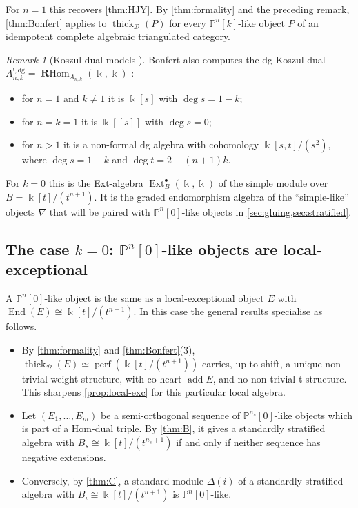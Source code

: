 \documentclass[11pt,reqno]{amsart}
\theoremstyle{plain}
\theoremstyle{definition}
\theoremstyle{remark}
\newtheorem{remark}[theorem]{Remark}
\newcommand{\kk}{\Bbbk}
\DeclareMathOperator{\End}{End}
\DeclareMathOperator{\Ext}{Ext}
\DeclareMathOperator{\add}{add}
\DeclareMathOperator{\RHom}{\mathbf{R}Hom}
\newcommand{\thick}[2][\cD]{\operatorname{thick}_{#1}(#2)}
\newcommand{\Pn}[2]{\mathbb{P}^{#1}[#2]}
\newcommand{\nablabar}{\overline{\nabla}}
\newcommand{\cD}{\mathcal{D}}
\begin{document}
For $n=1$ this recovers \cref{thm:HJY}. By \cref{thm:formality} and the preceding remark, \cref{thm:Bonfert} applies to $\thick P$ for every $\Pn nk$-like object $P$ of an idempotent complete algebraic triangulated category.

\begin{remark}[{Koszul dual models \cite[\S4]{Bonf26}}]\label{rem:Bonfert-Koszul}
Bonfert also computes the dg Koszul dual $A_{n,k}^{!,\mathrm{dg}}=\RHom_{A_{n,k}}(\kk,\kk)$ \cite[Thm.~4.9, Props.~4.11 and~4.12]{Bonf26}:
\begin{itemize}
\item for $n=1$ and $k\ne1$ it is $\kk[s]$ with $\deg s=1-k$;
\item for $n=k=1$ it is $\kk[[s]]$ with $\deg s=0$;
\item for $n>1$ it is a non-formal dg algebra with cohomology $\kk[s,t]/(s^2)$, where $\deg s=1-k$ and $\deg t=2-(n+1)k$.
\end{itemize}
For $k=0$ this is the Ext-algebra $\Ext^\bullet_B(\kk,\kk)$ of the simple module over $B=\kk[t]/(t^{n+1})$. It is the graded endomorphism algebra of the ``simple-like'' objects $\nablabar$ that will be paired with $\Pn n0$-like objects in \cref{sec:gluing,sec:stratified}.
\end{remark}

\subsection{The case \texorpdfstring{$k=0$}{k=0}: \texorpdfstring{$\mathbb{P}^n[0]$}{Pn[0]}-like objects are local-exceptional}\label{sec:P-zero}

A $\Pn n0$-like object is the same as a local-exceptional object $E$ with $\End(E)\cong\kk[t]/(t^{n+1})$. In this case the general results specialise as follows.
\begin{itemize}
\item By \cref{thm:formality} and \cref{thm:Bonfert}(3), $\thick{E}\simeq\operatorname{perf}(\kk[t]/(t^{n+1}))$ carries, up to shift, a unique non-trivial weight structure, with co-heart $\add E$, and no non-trivial t-structure. This sharpens \cref{prop:local-exc} for this particular local algebra.
\item Let $(E_1,\dots,E_m)$ be a semi-orthogonal sequence of $\Pn{n_s}0$-like objects which is part of a Hom-dual triple. By \cref{thm:B}, it gives a standardly stratified algebra with $B_s\cong\kk[t]/(t^{n_s+1})$ if and only if neither sequence has negative extensions.
\item Conversely, by \cref{thm:C}, a standard module $\Delta(i)$ of a standardly stratified algebra with $B_i\cong\kk[t]/(t^{n+1})$ is $\Pn n0$-like.
\end{itemize}
\end{document}

